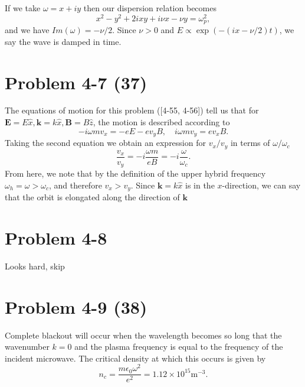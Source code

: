If we take \(\omega = x + iy \) then our dispersion relation becomes
\begin{equation*}
	x^2 -y^2 + 2ixy + i\nu x - \nu y = \omega_p^2,
\end{equation*}
and we have \(Im(\omega) = -\nu/2\). Since \(\nu > 0 \) and \(E \propto \exp(-(ix-\nu/2)t) \), we say the wave is damped in time. 

\section*{Problem 4-7 (37)}
\label{sec:4-7}
The equations of motion for this problem ([4-55, 4-56]) tell us that for \(\bm{E} = E\hat{x}, \bm{k} = k\hat{x}, \bm{B} = B\hat{z} \), the motion is described according to
\begin{equation*}
	-i\omega m v_x = -eE - ev_yB, \quad i\omega m v_y = ev_xB.
\end{equation*}
Taking the second equation we obtain an expression for \(v_x/v_y\) in terms of \(\omega/\omega_c \)
\begin{equation*}
	\dfrac{v_x}{v_y} = -i\dfrac{\omega m}{eB} = -i\dfrac{\omega}{\omega_c}.
\end{equation*}
From here, we note that by the definition of the upper hybrid frequency \(\omega_h = \omega > \omega_c \), and therefore \(v_x > v_y \). Since \(\bm{k} = k\hat{x}\) is in the \(x\)-direction, we can say that the orbit is elongated along the direction of \(\bm{k}\)

\section*{Problem 4-8}
\label{sec:4-8}
Looks hard, skip


\section*{Problem 4-9 (38)}
\label{sec:4-9}
Complete blackout will occur when the wavelength becomes so long that the wavenumber \(k = 0\) and the plasma frequency is equal to the frequency of the incident microwave. The critical density at which this occurs is given by
\begin{equation*}
	n_c = \dfrac{m\epsilon_0\omega^2}{e^2} = 1.12 \times 10^{15}\text{m}^{-3}.
\end{equation*}


